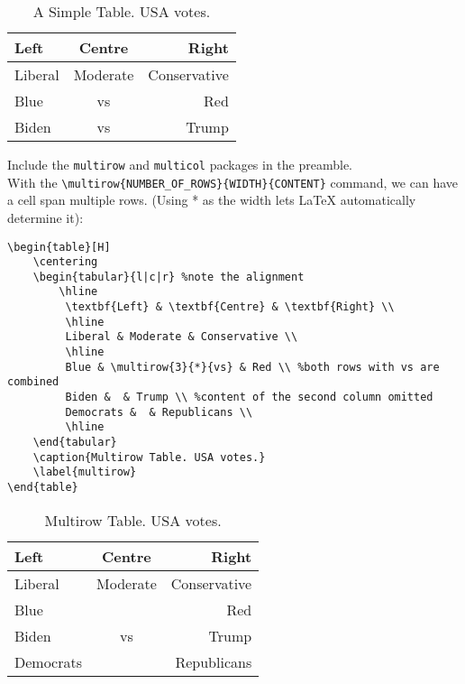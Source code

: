 \documentclass[12pt, letterpaper]{article}
\theoremstyle{remark}
\begin{document}
\begin{table}[H]
    \centering
    \begin{tabular}{l|c|r} %
        \hline
         \textbf{Left} & \textbf{Centre} & \textbf{Right} \\
         \hline 
         Liberal & Moderate & Conservative \\
         Blue & vs & Red \\
         Biden & vs & Trump \\
         \hline
    \end{tabular}
    \caption{A Simple Table. USA votes.}
    \label{tab:my_label}
\end{table}

Include the \verb!multirow! and \verb!multicol! packages in the preamble. \\
With the \verb!\multirow{NUMBER_OF_ROWS}{WIDTH}{CONTENT}! command, we can have a cell span multiple rows. (Using * as the width lets \LaTeX{} automatically determine it):
\begin{lstlisting}
\begin{table}[H]
    \centering
    \begin{tabular}{l|c|r} %note the alignment
        \hline
         \textbf{Left} & \textbf{Centre} & \textbf{Right} \\
         \hline 
         Liberal & Moderate & Conservative \\
         \hline
         Blue & \multirow{3}{*}{vs} & Red \\ %both rows with vs are combined
         Biden &  & Trump \\ %content of the second column omitted
         Democrats &  & Republicans \\
         \hline
    \end{tabular}
    \caption{Multirow Table. USA votes.}
    \label{multirow}
\end{table}
\end{lstlisting}

\begin{table}[H]
    \centering
    \begin{tabular}{l|c|r} %
        \hline
         \textbf{Left} & \textbf{Centre} & \textbf{Right} \\
         \hline 
         Liberal & Moderate & Conservative \\
         \hline
         Blue & \multirow{3}{*}{vs} & Red \\ %
         Biden &  & Trump \\ %
         Democrats &  & Republicans \\
         \hline
    \end{tabular}
    \caption{Multirow Table. USA votes.}
    \label{multirow}
\end{table}
\end{document}
